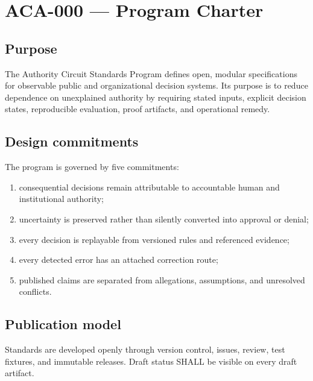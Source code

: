 \chapter{ACA-000 --- Program Charter}
\section{Purpose}
The Authority Circuit Standards Program defines open, modular specifications for observable public and organizational decision systems. Its purpose is to reduce dependence on unexplained authority by requiring stated inputs, explicit decision states, reproducible evaluation, proof artifacts, and operational remedy.

\section{Design commitments}
The program is governed by five commitments:
\begin{enumerate}[label=\arabic*.]
\item consequential decisions remain attributable to accountable human and institutional authority;
\item uncertainty is preserved rather than silently converted into approval or denial;
\item every decision is replayable from versioned rules and referenced evidence;
\item every detected error has an attached correction route;
\item published claims are separated from allegations, assumptions, and unresolved conflicts.
\end{enumerate}

\section{Publication model}
Standards are developed openly through version control, issues, review, test fixtures, and immutable releases. Draft status SHALL be visible on every draft artifact.
